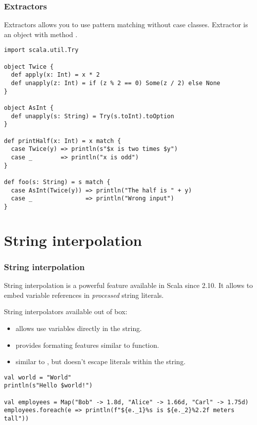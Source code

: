 \documentclass[t]{beamer}
\begin{document}
\begin{frame}[fragile]
\frametitle{Extractors}

Extractors allows you to use pattern matching without case classes. Extractor is an object with
method .

\begin{example}
\begin{lstlisting}
import scala.util.Try

object Twice {
  def apply(x: Int) = x * 2
  def unapply(z: Int) = if (z % 2 == 0) Some(z / 2) else None
}

object AsInt {
  def unapply(s: String) = Try(s.toInt).toOption
}

def printHalf(x: Int) = x match {
  case Twice(y) => println(s"$x is two times $y")
  case _        => println("x is odd")
}

def foo(s: String) = s match {
  case AsInt(Twice(y)) => println("The half is " + y)
  case _               => println("Wrong input")
}
\end{lstlisting}
\end{example}
\end{frame}

\section{String interpolation}

\begin{frame}[fragile]
\frametitle{String interpolation}

String interpolation is a powerful feature available in Scala since 2.10.  It allows to embed variable
references in \emph{processed} string literals.

String interpolators available out of box:
\begin{itemize}
\item {} allows use variables directly in the string.
\item {} provides formating features similar to  function.
\item {} similar to , but doesn't escape literals within the string.
\end{itemize}

\begin{example}
\begin{lstlisting}
val world = "World"
println(s"Hello $world!")

val employees = Map("Bob" -> 1.8d, "Alice" -> 1.66d, "Carl" -> 1.75d)
employees.foreach(e => println(f"${e._1}%s is ${e._2}%2.2f meters tall"))
\end{lstlisting}
\end{example}
\end{frame}
\end{document}

